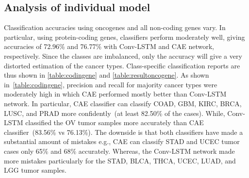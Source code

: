 \subsection{Analysis of individual model}
Classification accuracies using oncogenes and all non-coding genes vary. In particular, using protein-coding genes, classifiers perform moderately well, giving accuracies of 72.96\% and 76.77\% with Conv-LSTM and CAE network, respectively. Since the classes are imbalanced, only the accuracy will give a very distorted estimation of the cancer types. Class-specific classification reports are thus shown in \cref{table:codingene} and \cref{table:resultoncogene}. 
As shown in~\cref{table:codingene}, precision and recall for majority cancer types were moderately high in which CAE performed mostly better than Conv-LSTM network. In particular, CAE classifier can classify COAD, GBM, KIRC, BRCA, LUSC, and PRAD more confidently~(at least 82.50\% of the cases). While, Conv-LSTM classified the OV tumor samples more accurately than CAE classifier~(83.56\% vs 76.13\%). The downside is that both classifiers have made a substantial amount of mistakes e.g., CAE can classify STAD and UCEC tumor cases only 65\% and 68\% accurately. Whereas, the Conv-LSTM network made more mistakes particularly for the STAD, BLCA, THCA, UCEC, LUAD, and LGG tumor samples. 

